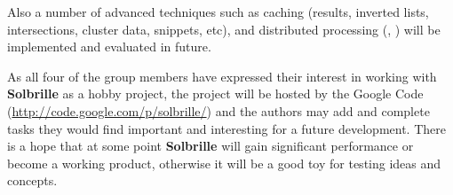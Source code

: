 Also a number of advanced techniques such as caching (results, inverted lists, intersections, cluster data, snippets, etc), and distributed processing (\cite{master}, \cite{risvik}) will be implemented and evaluated in future.

As all four of the group members have expressed their interest in working with {\bf Solbrille} as a hobby project, the project will be hosted by the Google Code (\url{http://code.google.com/p/solbrille/}) and the authors may add and complete tasks they would find important and interesting for a future development. There is a hope that at some point {\bf Solbrille} will gain significant performance or become a working product, otherwise it will be a good toy for testing ideas and concepts. 